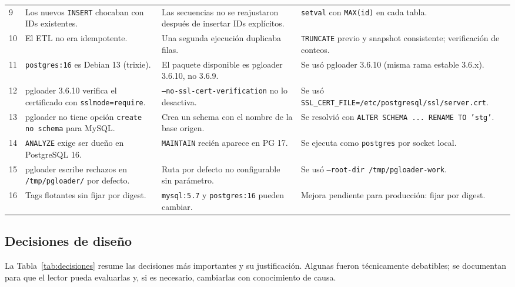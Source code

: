 \begin{longtable}{@{}C{0.8cm}L{3.4cm}L{3.8cm}L{5.4cm}@{}}
  9 & Los nuevos \texttt{INSERT} chocaban con IDs existentes. & Las secuencias no se reajustaron después de insertar IDs explícitos. & \texttt{setval} con \texttt{MAX(id)} en cada tabla. \\
  10 & El ETL no era idempotente. & Una segunda ejecución duplicaba filas. & \texttt{TRUNCATE} previo y snapshot consistente; verificación de conteos. \\
  11 & \texttt{postgres:16} es Debian 13 (trixie). & El paquete disponible es pgloader 3.6.10, no 3.6.9. & Se usó pgloader 3.6.10 (misma rama estable 3.6.x). \\
  12 & pgloader 3.6.10 verifica el certificado con \texttt{sslmode=require}. & \texttt{--no-ssl-cert-verification} no lo desactiva. & Se usó \texttt{SSL\_CERT\_FILE=/etc/postgresql/ssl/server.crt}. \\
  13 & pgloader no tiene opción \texttt{create no schema} para MySQL. & Crea un schema con el nombre de la base origen. & Se resolvió con \texttt{ALTER SCHEMA ... RENAME TO 'stg'}. \\
  14 & \texttt{ANALYZE} exige ser dueño en PostgreSQL 16. & \texttt{MAINTAIN} recién aparece en PG 17. & Se ejecuta como \texttt{postgres} por socket local. \\
  15 & pgloader escribe rechazos en \texttt{/tmp/pgloader/} por defecto. & Ruta por defecto no configurable sin parámetro. & Se usó \texttt{--root-dir /tmp/pgloader-work}. \\
  16 & Tags flotantes sin fijar por digest. & \texttt{mysql:5.7} y \texttt{postgres:16} pueden cambiar. & Mejora pendiente para producción: fijar por digest. \\
\end{longtable}
\endgroup

\subsection{Decisiones de diseño}

La Tabla~\ref{tab:decisiones} resume las decisiones más importantes y su
justificación. Algunas fueron técnicamente debatibles; se documentan para que
el lector pueda evaluarlas y, si es necesario, cambiarlas con conocimiento de
causa.

